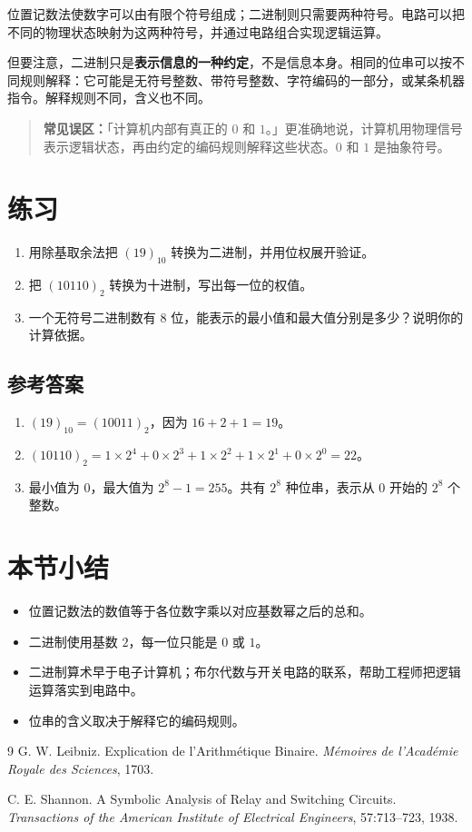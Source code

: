 \documentclass[12pt,a4paper]{ctexart}
\begin{document}
位置记数法使数字可以由有限个符号组成；二进制则只需要两种符号。电路可以把不同的物理状态映射为这两种符号，并通过电路组合实现逻辑运算。

但要注意，二进制只是\textbf{表示信息的一种约定}，不是信息本身。相同的位串可以按不同规则解释：它可能是无符号整数、带符号整数、字符编码的一部分，或某条机器指令。解释规则不同，含义也不同。

\begin{quote}
\textbf{常见误区：}「计算机内部有真正的 $0$ 和 $1$。」更准确地说，计算机用物理信号表示逻辑状态，再由约定的编码规则解释这些状态。$0$ 和 $1$ 是抽象符号。
\end{quote}

\section{练习}

\begin{enumerate}
    \item 用除基取余法把 $(19)_{10}$ 转换为二进制，并用位权展开验证。
    \item 把 $(10110)_2$ 转换为十进制，写出每一位的权值。
    \item 一个无符号二进制数有 $8$ 位，能表示的最小值和最大值分别是多少？说明你的计算依据。
\end{enumerate}

\subsection*{参考答案}
\begin{enumerate}
    \item $(19)_{10}=(10011)_2$，因为 $16+2+1=19$。
    \item $(10110)_2=1\times 2^4+0\times 2^3+1\times 2^2+1\times 2^1+0\times 2^0=22$。
    \item 最小值为 $0$，最大值为 $2^8-1=255$。共有 $2^8$ 种位串，表示从 $0$ 开始的 $2^8$ 个整数。
\end{enumerate}

\section*{本节小结}
\begin{itemize}
    \item 位置记数法的数值等于各位数字乘以对应基数幂之后的总和。
    \item 二进制使用基数 $2$，每一位只能是 $0$ 或 $1$。
    \item 二进制算术早于电子计算机；布尔代数与开关电路的联系，帮助工程师把逻辑运算落实到电路中。
    \item 位串的含义取决于解释它的编码规则。
\end{itemize}

\begin{thebibliography}{9}
G. W. Leibniz.
\newblock Explication de l'Arithmétique Binaire.
\newblock \emph{Mémoires de l'Académie Royale des Sciences}, 1703.

C. E. Shannon.
\newblock A Symbolic Analysis of Relay and Switching Circuits.
\newblock \emph{Transactions of the American Institute of Electrical Engineers},
57:713--723, 1938.
\end{thebibliography}
\end{document}
